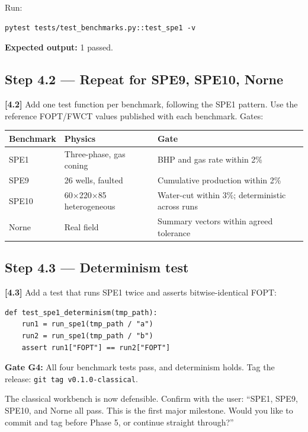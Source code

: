 \documentclass[10pt,a4paper]{article}
\newcommand{\stepID}[1]{\textsf{\textbf{[#1]}}}
\newcommand{\cmd}[1]{\texttt{#1}}
\begin{document}
Run:
\begin{lstlisting}[style=sh]
pytest tests/test_benchmarks.py::test_spe1 -v
\end{lstlisting}

\textbf{Expected output:} 1 passed.

\subsection{Step 4.2 --- Repeat for SPE9, SPE10, Norne}

\stepID{4.2} Add one test function per benchmark, following the SPE1 pattern. Use the reference FOPT/FWCT values published with each benchmark. Gates:

\begin{longtable}{@{}p{2cm}p{4cm}p{6cm}@{}}
\toprule
Benchmark & Physics & Gate\\
\midrule
SPE1 & Three-phase, gas coning & BHP and gas rate within 2\%\\
SPE9 & 26 wells, faulted & Cumulative production within 2\%\\
SPE10 & 60$\times$220$\times$85 heterogeneous & Water-cut within 3\%; deterministic across runs\\
Norne & Real field & Summary vectors within agreed tolerance\\
\bottomrule
\end{longtable}

\subsection{Step 4.3 --- Determinism test}

\stepID{4.3} Add a test that runs SPE1 twice and asserts bitwise-identical FOPT:

\begin{lstlisting}
def test_spe1_determinism(tmp_path):
    run1 = run_spe1(tmp_path / "a")
    run2 = run_spe1(tmp_path / "b")
    assert run1["FOPT"] == run2["FOPT"]
\end{lstlisting}

\begin{gate}
\textbf{Gate G4:} All four benchmark tests pass, and determinism holds. Tag the release: \cmd{git tag v0.1.0-classical}.
\end{gate}

\begin{aicheckpoint}
The classical workbench is now defensible. Confirm with the user: ``SPE1, SPE9, SPE10, and Norne all pass. This is the first major milestone. Would you like to commit and tag before Phase 5, or continue straight through?''
\end{aicheckpoint}
\end{document}
